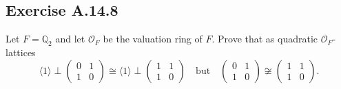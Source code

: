 \documentclass[12pt, a4paper]{article}
\begin{document}
\subsection*{Exercise A.14.8}
Let $F = \mathbb{Q}_2$ and let $\mathcal{O}_F$ be the valuation ring of $F$. Prove that as quadratic $\mathcal{O}_F$-lattices
\[ \langle 1 \rangle \perp \begin{pmatrix} 0 & 1 \\ 1 & 0 \end{pmatrix} \cong \langle 1 \rangle \perp \begin{pmatrix} 1 & 1 \\ 1 & 0 \end{pmatrix} \quad \text{but} \quad \begin{pmatrix} 0 & 1 \\ 1 & 0 \end{pmatrix} \not\cong \begin{pmatrix} 1 & 1 \\ 1 & 0 \end{pmatrix}. \]
\end{document}
